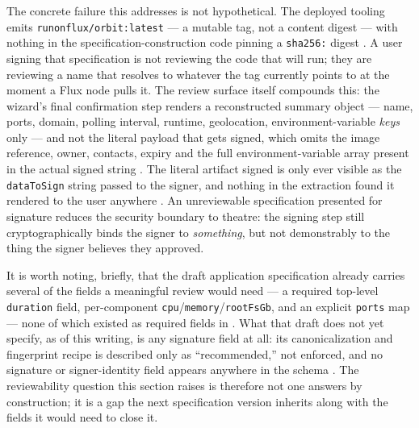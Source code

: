 The concrete failure this addresses is not hypothetical. The deployed tooling emits
\texttt{runonflux/\allowbreak{}orbit:latest} — a mutable tag, not a content digest — with nothing in
the specification-construction code pinning a \texttt{sha256:} digest \shipped
{}. A user
signing that specification is not reviewing the code that will run; they are reviewing
a name that resolves to whatever the tag currently points to at the moment a Flux node
pulls it. The review surface itself compounds this: the wizard's final confirmation step
renders a reconstructed summary object — name, ports, domain, polling interval, runtime,
geolocation, environment-variable \emph{keys} only — and not the literal 
payload that gets signed, which omits the image reference, owner, contacts, expiry and
the full environment-variable array present in the actual signed string
\shipped {}.
The literal artifact signed is only ever visible as the \texttt{dataToSign} string passed
to the signer, and nothing in the extraction found it rendered to the user anywhere
\shipped {}. An
unreviewable specification presented for signature reduces the security boundary to
theatre: the signing step still cryptographically binds the signer to \emph{something},
but not demonstrably to the thing the signer believes they approved.

It is worth noting, briefly, that the draft  application specification already
carries several of the fields a meaningful review would need — a required top-level
\texttt{duration} field, per-component \texttt{cpu}\slash\texttt{memory}\slash\texttt{rootFsGb}, and
an explicit \texttt{ports} map — none of which existed as required fields in 
\inprogress {}. What that draft
does not yet specify, as of this writing, is any signature field at all: its
canonicalization and fingerprint recipe is described only as ``recommended,'' not
enforced, and no signature or signer-identity field appears anywhere in the schema
\inprogress {}. The reviewability
question this section raises is therefore not one  answers by construction; it
is a gap the next specification version inherits along with the fields it would need to
close it.

